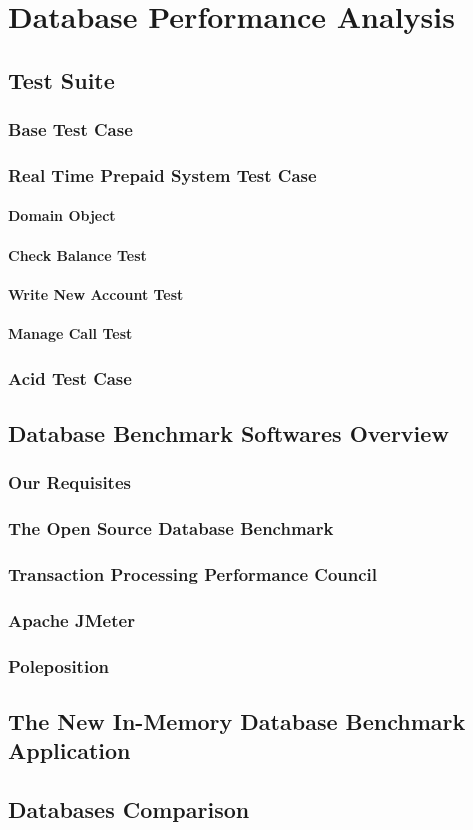 \part{Database Performance Analysis}

\chapter{Test Suite}
	\section{Base Test Case}
	\section{Real Time Prepaid System Test Case}
		\subsection{Domain Object}
		\subsection{Check Balance Test}
		\subsection{Write New Account Test}
		\subsection{Manage Call Test}
	\section{Acid Test Case}

\chapter{Database Benchmark Softwares Overview}
	\section{Our Requisites}%
	\section{The Open Source Database Benchmark}
	\section{Transaction Processing Performance Council}
	\section{Apache JMeter}
	\section{Poleposition}
	
\chapter{The New In-Memory Database Benchmark Application}

\chapter{Databases Comparison}
